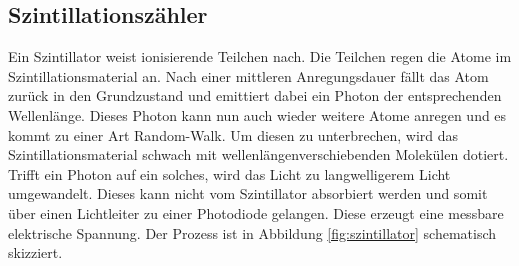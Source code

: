 \subsection{Szintillationszähler}
Ein Szintillator weist ionisierende Teilchen nach. Die Teilchen regen die Atome im Szintillationsmaterial an. Nach einer mittleren Anregungsdauer fällt das Atom zurück in den Grundzustand und emittiert dabei ein Photon der entsprechenden Wellenlänge. Dieses Photon kann nun auch wieder weitere Atome anregen und es kommt zu einer Art Random-Walk. Um diesen zu unterbrechen, wird das Szintillationsmaterial schwach mit wellenlängenverschiebenden Molekülen dotiert. Trifft ein Photon auf ein solches, wird das Licht zu langwelligerem Licht umgewandelt. Dieses kann nicht vom Szintillator absorbiert werden und somit über einen Lichtleiter zu einer Photodiode gelangen. Diese erzeugt eine messbare elektrische Spannung. Der Prozess ist in Abbildung \ref{fig:szintillator} schematisch skizziert.


